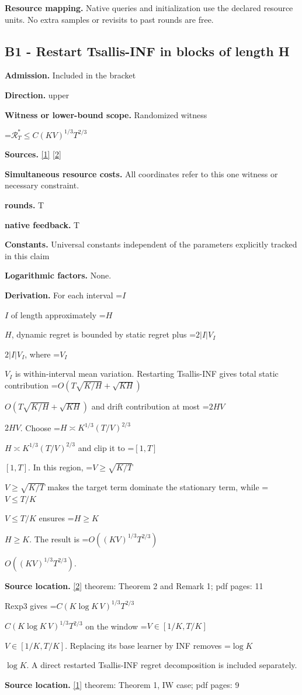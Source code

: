 \documentclass[10pt,a4paper]{article}
\newcommand{\AtlasMath}[1]{\par\begingroup\centering\setbox0=\hbox{$\displaystyle #1$}\ifdim\wd0>1.4\linewidth\typeout{ATLAS WIDE FORMULA: \the\wd0}\fi\ifdim\wd0>\linewidth\resizebox{\linewidth}{!}{\box0}\else\box0\fi\par\endgroup}
\newcommand{\AtlasInlineMath}[1]{\begingroup\setbox0=\hbox{$#1$}\ifdim\wd0>.4\linewidth\endgroup\AtlasMath{#1}\else\endgroup$#1$\fi}
\begin{document}
\textbf{Resource mapping.} Native queries and initialization use the declared resource units. No extra samples or revisits to past rounds are free.

\subsection{B1 - Restart Tsallis-INF in blocks of length H}
\textbf{Admission.} Included in the bracket

\textbf{Direction.} upper

\textbf{Witness or lower-bound scope.} Randomized witness

\AtlasMath{\mathcal{R}_T^*\le C(KV)^{1/3}T^{2/3}}
\textbf{Sources.} \href{https://jmlr.org/papers/volume22/19-753/19-753.pdf}{[1]} \href{https://arxiv.org/pdf/1405.3316v2}{[2]}

\textbf{Simultaneous resource costs.} All coordinates refer to this one witness or necessary constraint.

\textbf{rounds.} T

\textbf{native feedback.} T

\textbf{Constants.} Universal constants independent of the parameters explicitly tracked in this claim

\textbf{Logarithmic factors.} None.

\textbf{Derivation.} For each interval \AtlasInlineMath{I} of length approximately \AtlasInlineMath{H}, dynamic regret is bounded by static regret plus \AtlasInlineMath{2|I|V_I}, where \AtlasInlineMath{V_I} is within-interval mean variation. Restarting Tsallis-INF gives total static contribution \AtlasInlineMath{O(T\sqrt{K/H}+\sqrt{KH})} and drift contribution at most \AtlasInlineMath{2HV}. Choose \AtlasInlineMath{H\asymp K^{1/3}(T/V)^{2/3}} and clip it to \AtlasInlineMath{[1,T]}. In this region, \AtlasInlineMath{V\ge\sqrt{K/T}} makes the target term dominate the stationary term, while \AtlasInlineMath{V\le T/K} ensures \AtlasInlineMath{H\ge K}. The result is \AtlasInlineMath{O((KV)^{1/3}T^{2/3})}.

\textbf{Source location.} \href{https://arxiv.org/pdf/1405.3316v2}{[2]} theorem: Theorem 2 and Remark 1; pdf pages: 11

Rexp3 gives \AtlasInlineMath{C(K\log K\,V)^{1/3}T^{2/3}} on the window \AtlasInlineMath{V\in[1/K,T/K]}. Replacing its base learner by INF removes \AtlasInlineMath{\log K}. A direct restarted Tsallis-INF regret decomposition is included separately.

\textbf{Source location.} \href{https://jmlr.org/papers/volume22/19-753/19-753.pdf}{[1]} theorem: Theorem 1, IW case; pdf pages: 9
\end{document}

